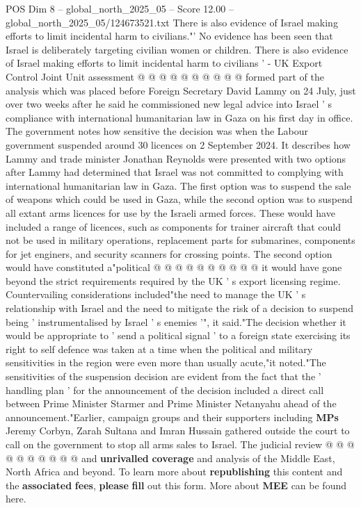 \begin{textsample}{POS Dim 8 – global\_north\_2025\_05 – Score 12.00 – global\_north\_2025\_05/124673521.txt}
There is also evidence of Israel making efforts to limit incidental harm to civilians."' No evidence has been seen that Israel is deliberately targeting civilian women or children.
There is also evidence of Israel making efforts to limit incidental harm to civilians ' - UK Export Control Joint Unit assessment @ @ @ @ @ @ @ @ @ @ formed part of the analysis which was placed before Foreign Secretary David Lammy on 24 July, just over two weeks after he said he commissioned new legal advice into Israel ' s compliance with international humanitarian law in Gaza on his first day in office.
The government notes how sensitive the decision was when the Labour government suspended around 30 licences on 2 September 2024.
It describes how Lammy and trade minister Jonathan Reynolds were presented with two options after Lammy had determined that Israel was not committed to complying with international humanitarian law in Gaza.
The first option was to suspend the sale of weapons which could be used in Gaza, while the second option was to suspend all extant arms licences for use by the Israeli armed forces.
These would have included a range of licences, such as components for trainer aircraft that could not be used in military operations, replacement parts for submarines, components for jet enginers, and security scanners for crossing points.
The second option would have constituted a"political @ @ @ @ @ @ @ @ @ @ it would have gone beyond the strict requirements required by the UK ' s export licensing regime.
Countervailing considerations included"the need to manage the UK ' s relationship with Israel and the need to mitigate the risk of a decision to suspend being ' instrumentalised by Israel ' s enemies '", it said."The decision whether it would be appropriate to ' send a political signal ' to a foreign state exercising its right to self defence was taken at a time when the political and military sensitivities in the region were even more than usually acute,"it noted."The sensitivities of the suspension decision are evident from the fact that the ' handling plan ' for the announcement of the decision included a direct call between Prime Minister Starmer and Prime Minister Netanyahu ahead of the announcement."Earlier, campaign groups and their supporters including \textbf{MPs} Jeremy Corbyn, Zarah Sultana and Imran Hussain gathered outside the court to call on the government to stop all arms sales to Israel.
The judicial review @ @ @ @ @ @ @ @ @ @ and \textbf{unrivalled} \textbf{coverage} and analysis of the Middle East, North Africa and beyond.
To learn more about \textbf{republishing} this content and the \textbf{associated} \textbf{fees}, \textbf{please} \textbf{fill} out this form.
More about \textbf{MEE} can be found here.

\end{textsample}
